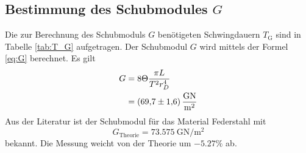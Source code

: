 \subsection{Bestimmung des Schubmodules \texorpdfstring{$G$}{G}}

Die zur Berechnung des Schubmoduls $G$ benötigeten Schwingdauern $T_\text{G}$ sind in Tabelle \ref{tab:T_G} aufgetragen.
Der Schubmodul $G$ wird mittels der Formel \eqref{eq:G} berechnet.
Es gilt
\begin{align}
	G 	&=  8 \Theta\frac{\pi L}{T^2 r_D^4}\\%
		&=	\SI{69.7\pm1.6}{\giga\newton\per\meter\squared}
	\label{eq:schubmodul}
	\end{align}
Aus der Literatur ist der Schubmodul für das Material Federstahl mit
\begin{equation}
	G_\text{Theorie} = \SI{73.575}{\giga\newton\per\meter\squared}
\end{equation}bekannt.
Die Messung weicht von der Theorie um $-5.27\%$ ab.
